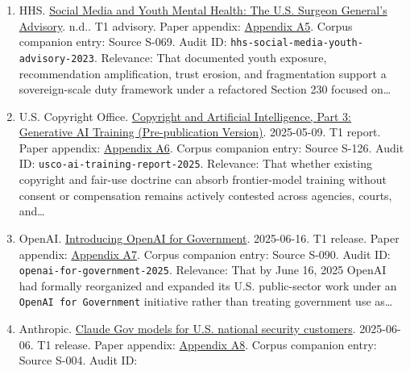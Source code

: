 \documentclass[
  american,
  11pt,
  letterpaper,
]{article}
\begin{document}
\begin{enumerate}
  platforms should be regulated on the basis of design, amplification,
  targeting, monetization, moderation architecture, and systemic reach
  rather than passiv\ldots{}
\item
  HHS.
  \href{https://www.hhs.gov/surgeongeneral/priorities/youth-mental-health/social-media/index.html}{Social
  Media and Youth Mental Health: The U.S. Surgeon General's Advisory}.
  n.d.. T1 advisory. Paper appendix:
  \hyperref[appendix-a5-social-media-and-youth-mental-health-the-u-s-surgeon-general-s-advisory]{Appendix
  A5}. Corpus companion entry: Source S-069. Audit ID:
  \texttt{hhs-social-media-youth-advisory-2023}. Relevance: That
  documented youth exposure, recommendation amplification, trust
  erosion, and fragmentation support a sovereign-scale duty framework
  under a refactored Section 230 focused on\ldots{}
\item
  U.S. Copyright Office.
  \href{https://copyright.gov/ai/Copyright-and-Artificial-Intelligence-Part-3-Generative-AI-Training-Report-Pre-Publication-Version.pdf}{Copyright
  and Artificial Intelligence, Part 3: Generative AI Training
  (Pre-publication Version)}. 2025-05-09. T1 report. Paper appendix:
  \hyperref[appendix-a6-copyright-and-artificial-intelligence-part-3-generative-ai-training-pre-publication-version]{Appendix
  A6}. Corpus companion entry: Source S-126. Audit ID:
  \texttt{usco-ai-training-report-2025}. Relevance: That whether
  existing copyright and fair-use doctrine can absorb frontier-model
  training without consent or compensation remains actively contested
  across agencies, courts, and\ldots{}
\item
  OpenAI.
  \href{https://openai.com/global-affairs/introducing-openai-for-government/}{Introducing
  OpenAI for Government}. 2025-06-16. T1 release. Paper appendix:
  \hyperref[appendix-a7-introducing-openai-for-government]{Appendix A7}.
  Corpus companion entry: Source S-090. Audit ID:
  \texttt{openai-for-government-2025}. Relevance: That by June 16, 2025
  OpenAI had formally reorganized and expanded its U.S. public-sector
  work under an \texttt{OpenAI\ for\ Government} initiative rather than
  treating government use as\ldots{}
\item
  Anthropic.
  \href{https://www.anthropic.com/news/claude-gov-models-for-u-s-national-security-customers}{Claude
  Gov models for U.S. national security customers}. 2025-06-06. T1
  release. Paper appendix:
  \hyperref[appendix-a8-claude-gov-models-for-u-s-national-security-customers]{Appendix
  A8}. Corpus companion entry: Source S-004. Audit ID:

\end{enumerate}
\end{document}

